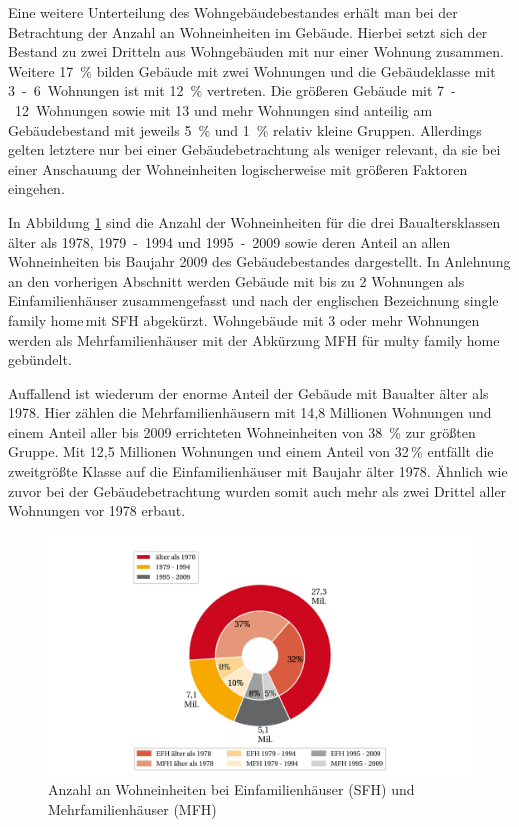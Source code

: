 
Eine weitere Unterteilung des Wohngebäudebestandes erhält man bei der Betrachtung der Anzahl an Wohneinheiten im Gebäude. 
Hierbei setzt sich der Bestand zu zwei Dritteln aus Wohngebäuden mit nur einer Wohnung zusammen. 
Weitere \mbox{17 \%} bilden Gebäude mit zwei Wohnungen und die Gebäudeklasse mit \mbox{3 - 6 Wohnungen} ist mit \mbox{12 \%} vertreten. 
Die größeren Gebäude mit \mbox{7 - 12 Wohnungen} sowie mit 13 und mehr Wohnungen sind anteilig am Gebäudebestand mit jeweils \mbox{5 \%} und \mbox{1 \%} relativ kleine Gruppen. 
Allerdings gelten letztere nur bei einer Gebäudebetrachtung als weniger relevant, da sie bei einer Anschauung der Wohneinheiten logischerweise mit größeren Faktoren eingehen. \cite{StatistischeAmterdesBundesundderLander.2014b}

In Abbildung \ref{fig: Abbildung212} sind die Anzahl der Wohneinheiten für die drei Baualtersklassen älter als 1978, \mbox{1979 - 1994} und \mbox{1995 - 2009} sowie deren Anteil an allen Wohneinheiten bis Baujahr 2009 des Gebäudebestandes dargestellt. 
In Anlehnung an den vorherigen Abschnitt werden Gebäude mit bis zu 2 Wohnungen als Einfamilienhäuser zusammengefasst und nach der englischen Bezeichnung \glqq single family home\grqq \,mit SFH abgekürzt. 
Wohngebäude mit 3 oder mehr Wohnungen werden als Mehrfamilienhäuser mit der Abkürzung MFH für \glqq multy family home\grqq\,gebündelt. 

Auffallend ist wiederum der enorme Anteil der Gebäude mit Baualter älter als 1978. 
Hier zählen die Mehrfamilienhäusern mit 14,8 Millionen Wohnungen und einem Anteil aller bis 2009 errichteten Wohneinheiten von \mbox{38 \%} zur größten Gruppe. 
Mit 12,5 Millionen Wohnungen und einem Anteil von 32\,\% entfällt die zweitgrößte Klasse auf die Einfamilienhäuser mit Baujahr älter 1978.
Ähnlich wie zuvor bei der Gebäudebetrachtung wurden somit auch mehr als zwei Drittel aller Wohnungen vor 1978 erbaut.


\begin{figure}[H]
	\centering
		\includegraphics{Pictures/GebaeudeGroesse.jpg}
	\caption{Anzahl an Wohneinheiten bei Einfamilienhäuser (SFH) und Mehrfamilienhäuser (MFH) \cite{StatistischeAmterdesBundesundderLander.2014b}}
	\label{fig: Abbildung212} 
\end{figure}

